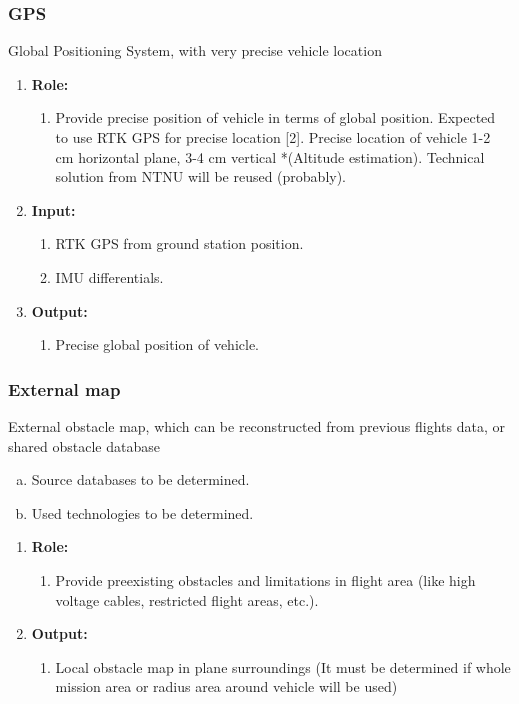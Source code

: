 \subsubsection{GPS}
	Global Positioning System, with very precise vehicle location
	\begin{enumerate}[]
	\item \textbf{Role:}
		\begin{enumerate}[]
		\item Provide precise position of vehicle in terms of global position. 
		Expected to use RTK GPS for precise location [2].
		Precise location of vehicle 1-2 cm horizontal plane, 3-4 cm vertical *(Altitude estimation).
		Technical solution from NTNU will be reused (probably).
		\end{enumerate}
	\item \textbf{Input:}
		\begin{enumerate}[1.]
			\item RTK GPS from ground station position.
			\item IMU differentials.
		\end{enumerate}
	\item \textbf{Output:}
		\begin{enumerate}[1.]
		\item Precise global position of vehicle.
		\end{enumerate}
	\end{enumerate}
	
\subsubsection{External map}
	External obstacle map, which can be reconstructed from previous flights data, or shared obstacle database
	\begin{enumerate}[a.]
		\item Source databases to be determined.
		\item Used technologies to be determined.
	\end{enumerate}
	\begin{enumerate}[]
	\item \textbf{Role:}
		\begin{enumerate}[]
		\item Provide preexisting obstacles and limitations in flight area (like high voltage cables, restricted flight areas, etc.).
		\end{enumerate}
	\item \textbf{Output:}
		\begin{enumerate}[]
		\item Local obstacle map in plane surroundings (It must be determined if whole mission area or radius area around vehicle will be used)
		\end{enumerate}
	\end{enumerate}

